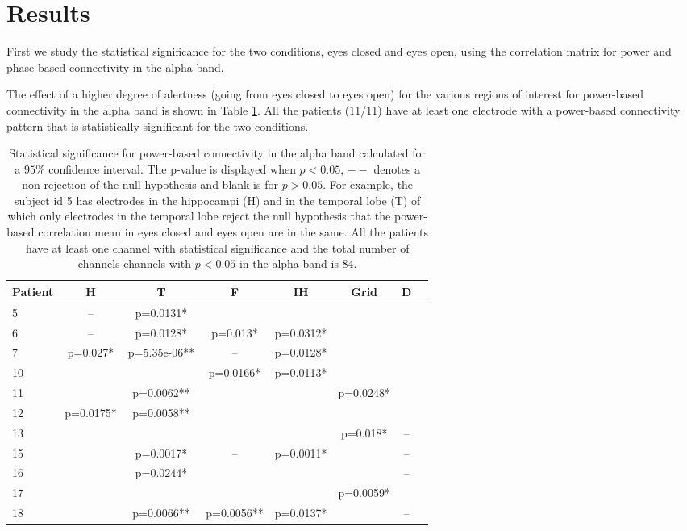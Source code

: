\documentclass[11pt, onecolumn]{article}
\begin{document}
\section*{Results}

First we study the statistical significance for the two conditions, eyes closed and eyes open, using the correlation matrix for power and phase based connectivity in the alpha band. 

The effect of a higher degree of alertness (going from eyes closed to eyes open) for the various regions of interest for power-based connectivity in the alpha band is shown in Table \ref{Table:powconnect}. All the patients (11/11) have at least one electrode with a power-based connectivity pattern that is statistically significant for the two conditions.


\begin{table}
\centering
\begin{tabular}{l*{6}{c}r}
Patient & H & T & F & IH & Grid & D  \\
\hline
5 & -- & p=0.0131* &  & &  &  \\ %
6 & -- & p=0.0128* & p=0.013* & p=0.0312* &  & \\ %
7 &  p=0.027*  &  p=5.35e-06**  & -- &  p=0.0128* & & \\
10 &  &  &  p=0.0166*  &   p=0.0113* &  &  \\
11 &  &  p=0.0062** &  &  &   p=0.0248*\\
12 &  p=0.0175* &  p=0.0058** &  &  & & \\ %
13 &  &  &  &  &  p=0.018* & -- \\%
15 &  &   p=0.0017* & -- &  p=0.0011* &  & --\\
16 &  &  p=0.0244* &  &  &  & -- \\
17 &  &  &  &  &   p=0.0059* & \\ %
18 &  &  p=0.0066** &  p=0.0056** &  p=0.0137* &  & --  \\
\end{tabular}
\caption{\label{Table:powconnect} 
Statistical significance for power-based connectivity in the alpha band calculated for a $95\%$ confidence interval. The p-value is displayed when $p<0.05$, $--$ denotes a non rejection of the null hypothesis and blank is for $p>0.05$. For example, the subject id 5 has electrodes in the hippocampi (H) and in the temporal lobe (T) of which only electrodes in the temporal lobe reject the null hypothesis that the power-based correlation mean in eyes closed and eyes open are in the same. All the patients have at least one channel with statistical significance and the total number of channels channels with $p<0.05$ in the alpha band is 84.
}
\end{table}
\end{document}
